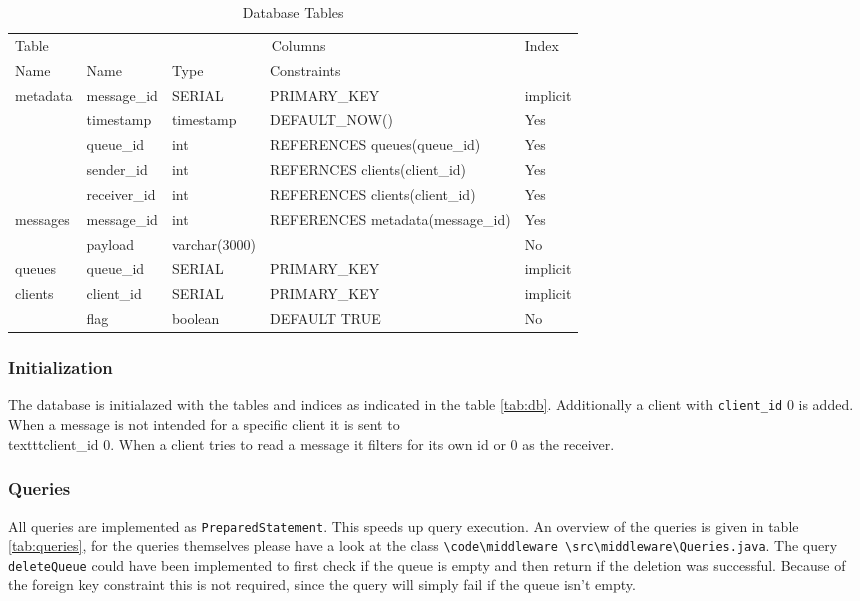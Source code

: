\documentclass[
10pt, %
a4paper, %
oneside, %
headinclude,footinclude, %
BCOR5mm, %
]{scrartcl}
\begin{document}
\begin{table}[H]
\begin{adjustwidth}{-2in}{-2in}
\caption{Database Tables}
\centering
\begin{tabular}{|l|lll|l|}
\toprule
Table&
\multicolumn{3}{c|}{Columns} & Index \\
\cmidrule(l){2-4}
Name & Name & Type & Constraints & \\
\midrule
metadata & message\_id	& SERIAL & PRIMARY\_KEY & implicit\\
		&timestamp & timestamp & DEFAULT\_NOW() & Yes\\
			&queue\_id	&int 	& REFERENCES queues(queue\_id)&Yes\\
			&sender\_id	&int 	& REFERNCES clients(client\_id)&Yes\\
			&receiver\_id&int 	& REFERENCES clients(client\_id)& Yes\\
\midrule
messages	&message\_id&int 	& REFERENCES metadata(message\_id)&Yes\\
			&payload	&varchar(3000)& &No\\
\midrule
queues		&queue\_id 	&SERIAL & PRIMARY\_KEY&implicit\\
\midrule
clients 	&client\_id 	&SERIAL	& PRIMARY\_KEY&implicit\\
			&flag 		&boolean&DEFAULT TRUE&No\\
\bottomrule
\end{tabular}
\label{tab:db}
\end{adjustwidth}

\end{table}




\subsubsection{Initialization}
The database is initialazed with the tables and indices as indicated in the table \vref{tab:db}. Additionally a client with \texttt{client\_id} 0 is added. When a message is not intended for a specific client it is sent to \\texttt{client\_id} 0. When a client tries to read a message it filters for its own id or 0 as the receiver.

\subsubsection{Queries}
All queries are implemented as \texttt{PreparedStatement}. This speeds up query execution. An overview of the queries is given in table \vref{tab:queries}, for the queries themselves please have a look at the class \texttt{\textbackslash code\textbackslash middleware \textbackslash src\textbackslash middleware\textbackslash Queries.java}. The query \texttt{deleteQueue} could have been implemented to first check if the queue is empty and then return if the deletion was successful. Because of the foreign key constraint this is not required, since the query will simply fail if the queue isn't empty. 
\end{document}
